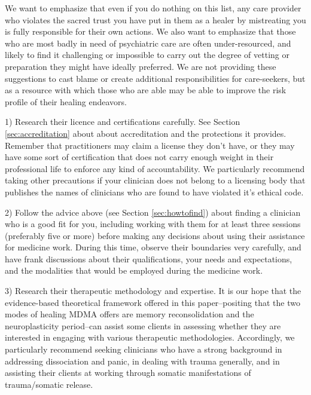 \documentclass[12pt,letterpaper]{book}
\begin{document}
We want to emphasize that even if you do nothing on this list, any care provider who violates the sacred trust you have put in them as a healer by mistreating you is fully responsible for their own actions. We also want to emphasize that those who are most badly in need of psychiatric care are often under-resourced, and likely to find it challenging or impossible to carry out the degree of vetting or preparation they might have ideally preferred. We are not providing these suggestions to cast blame or create additional responsibilities for care-seekers, but as a resource with which those who are able may be able to improve the risk profile of their healing endeavors.

1) Research their licence and certifications carefully. See Section \ref{sec:accreditation} about about accreditation and the protections it provides. Remember that practitioners may claim a license they don’t have, or they may have some sort of certification that does not carry enough weight in their professional life to enforce any kind of accountability. We particularly recommend taking other precautions if your clinician does not belong to a licensing body that publishes the names of clinicians who are found to have violated it's ethical code.

2) Follow the advice above (see Section \ref{sec:howtofind}) about finding a clinician who is a good fit for you, including working with them for at least three sessions (preferably five or more) before making any decisions about using their assistance for medicine work. During this time, observe their boundaries very carefully, and have frank discussions about their qualifications, your needs and expectations, and the modalities that would be employed during the medicine work.

3) Research their therapeutic methodology and expertise.  It is our hope that the evidence-based theoretical framework offered in this paper--positing that the two modes of healing MDMA offers are memory reconsolidation and the neuroplasticity period--can assist some clients in assessing whether they are interested in engaging with various therapeutic methodologies. Accordingly, we particularly recommend seeking clinicians who have a strong background in addressing dissociation and panic, in dealing with trauma generally, and in assisting their clients at working through somatic manifestations of trauma/somatic release.
\end{document}
